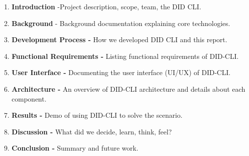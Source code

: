 \begin{enumerate}
\def\labelenumi{\arabic{enumi}.}
\tightlist
\item
  \textbf{Introduction} -Project description, scope, team, the DID CLI.
\item
  \textbf{Background} - Background documentation explaining core technologies.
\item
  \textbf{Development Process -} How we developed DID CLI and this
  report.
\item
  \textbf{Functional Requirements -} Listing functional requirements of DID-CLI.
\item
  \textbf{User Interface -} Documenting the user interface (UI/UX) of DID-CLI.
\item
  \textbf{Architecture -} An overview of DID-CLI architecture and details about each component.
\item
  \textbf{Results -} Demo of using DID-CLI to solve the scenario.
\item
  \textbf{Discussion -} What did we decide, learn, think, feel?
\item
  \textbf{Conclusion -} Summary and future work.
\end{enumerate}
